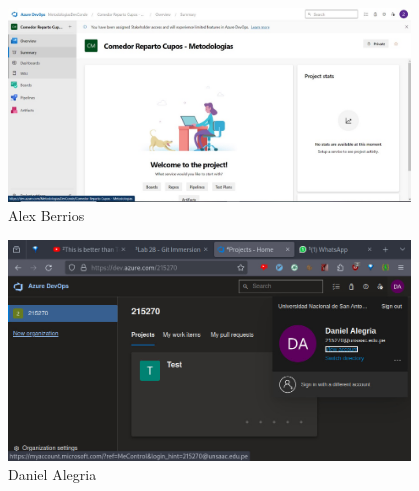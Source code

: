 \begin{figure}[h]
    \caption{Alex Berrios}
    \begin{center}
        \includegraphics[width=0.95\textwidth]{images/devops_berrios.jpeg}
    \end{center}
\end{figure}

\begin{figure}[h]
    \caption{Daniel Alegria}
    \begin{center}
        \includegraphics[width=0.95\textwidth]{images/devops_alegria.jpeg}
    \end{center}
\end{figure}

